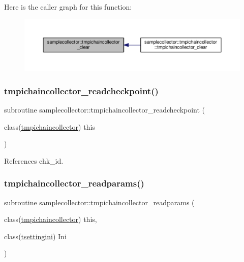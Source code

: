 Here is the caller graph for this function\+:
\nopagebreak
\begin{figure}[H]
\begin{center}
\leavevmode
\includegraphics[width=350pt]{namespacesamplecollector_ad209f28cb743e15c21d107934917f478_icgraph}
\end{center}
\end{figure}
\mbox{\label{namespacesamplecollector_a728766fe371777731c80f0e82ccba130}} 
\subsubsection{\texorpdfstring{tmpichaincollector\+\_\+readcheckpoint()}{tmpichaincollector\_readcheckpoint()}}
{\footnotesize\ttfamily subroutine samplecollector\+::tmpichaincollector\+\_\+readcheckpoint (\begin{DoxyParamCaption}\item[{class(\mbox{\hyperlink{structsamplecollector_1_1tmpichaincollector}{tmpichaincollector}})}]{this }\end{DoxyParamCaption})\hspace{0.3cm}{\ttfamily [private]}}



References chk\+\_\+id.

\mbox{\label{namespacesamplecollector_ac3a30bf96000547a9f7264b18de0c72a}} 
\subsubsection{\texorpdfstring{tmpichaincollector\+\_\+readparams()}{tmpichaincollector\_readparams()}}
{\footnotesize\ttfamily subroutine samplecollector\+::tmpichaincollector\+\_\+readparams (\begin{DoxyParamCaption}\item[{class(\mbox{\hyperlink{structsamplecollector_1_1tmpichaincollector}{tmpichaincollector}})}]{this,  }\item[{class(\mbox{\hyperlink{structsettings_1_1tsettingini}{tsettingini}})}]{Ini }\end{DoxyParamCaption})\hspace{0.3cm}{\ttfamily [private]}}

